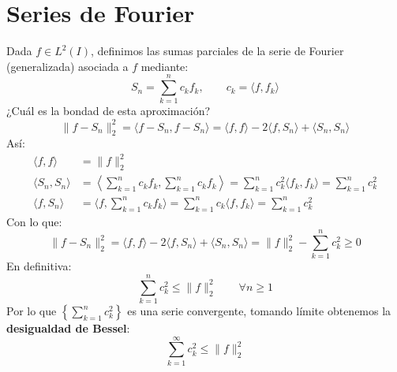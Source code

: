 \section{Series de Fourier}
\noindent
Dada $f\in L^2(I)$, definimos las sumas parciales de la serie de Fourier (generalizada) asociada a $f$ mediante:
\begin{equation*}
    S_n = \sum_{k=1}^{n} c_k f_k, \qquad c_k = \langle f,f_k \rangle 
\end{equation*}
¿Cuál es la bondad de esta aproximación?
\begin{equation*}
    \|f-S_n\|_2^2 = \langle f-S_n,f-S_n \rangle  = \langle f,f \rangle -2\langle f,S_n \rangle  + \langle S_n,S_n \rangle 
\end{equation*}
Así:
\begin{align*}
    \langle f,f \rangle &= \|f\|_2^2 \\
    \langle S_n,S_n \rangle  &= \left\langle \sum_{k=1}^{n}c_kf_k,\sum_{k=1}^{n}c_kf_k \right\rangle  = \sum_{k=1}^{n} c_k^2 \langle f_k,f_k \rangle  = \sum_{k=1}^{n} c_k^2 \\
    \langle f,S_n \rangle  &= \langle f,\sum_{k=1}^{n}c_kf_k \rangle = \sum_{k=1}^{n}c_k \langle f, f_k \rangle = \sum_{k=1}^{n} c_k^2
\end{align*}
Con lo que:
\begin{equation*}
    \|f-S_n\|_2^2 = \langle f,f \rangle - 2\langle f,S_n \rangle  + \langle S_n,S_n \rangle  =\|f\|_2^2 - \sum_{k=1}^{n}c_k^2 \geq 0
\end{equation*}
En definitiva:
\begin{equation*}
    \sum_{k=1}^{n}c_k^2 \leq \|f\|_2^2 \qquad \forall n\geq 1
\end{equation*}
Por lo que $\left\{\sum\limits_{k=1}^n c_k^2\right\}$ es una serie convergente, tomando límite obtenemos la \textbf{desigualdad de Bessel}:
\begin{equation*}
    \sum_{k=1}^{\infty}c_k^2 \leq \|f\|_2^2
\end{equation*}

